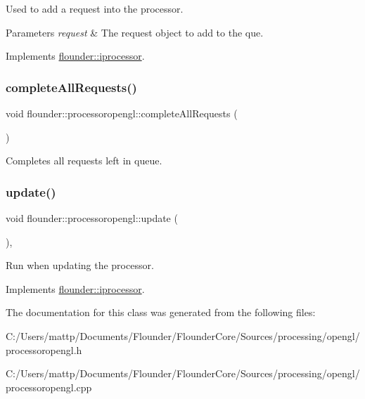 Used to add a request into the processor. 


\begin{DoxyParams}{Parameters}
{\em request} & The request object to add to the que. \\
\hline
\end{DoxyParams}


Implements \hyperlink{classflounder_1_1iprocessor_ad721814a6a2c69f526527c7b2f57a11b}{flounder\+::iprocessor}.

\mbox{\label{classflounder_1_1processoropengl_aa1c943138ae967f19584b7841afdfa2a}} 
\subsubsection{\texorpdfstring{complete\+All\+Requests()}{completeAllRequests()}}
{\footnotesize\ttfamily void flounder\+::processoropengl\+::complete\+All\+Requests (\begin{DoxyParamCaption}{ }\end{DoxyParamCaption})}



Completes all requests left in queue. 

\mbox{\label{classflounder_1_1processoropengl_ad3ca7ada749d785e44fa2b536839f684}} 
\subsubsection{\texorpdfstring{update()}{update()}}
{\footnotesize\ttfamily void flounder\+::processoropengl\+::update (\begin{DoxyParamCaption}{ }\end{DoxyParamCaption})\hspace{0.3cm}{\ttfamily [override]}, {\ttfamily [virtual]}}



Run when updating the processor. 



Implements \hyperlink{classflounder_1_1iprocessor_ad2edfece3465ec3dbe0a5feac26bdbc3}{flounder\+::iprocessor}.



The documentation for this class was generated from the following files\+:\begin{DoxyCompactItemize}
\item 
C\+:/\+Users/mattp/\+Documents/\+Flounder/\+Flounder\+Core/\+Sources/processing/opengl/processoropengl.\+h\item 
C\+:/\+Users/mattp/\+Documents/\+Flounder/\+Flounder\+Core/\+Sources/processing/opengl/processoropengl.\+cpp\end{DoxyCompactItemize}
